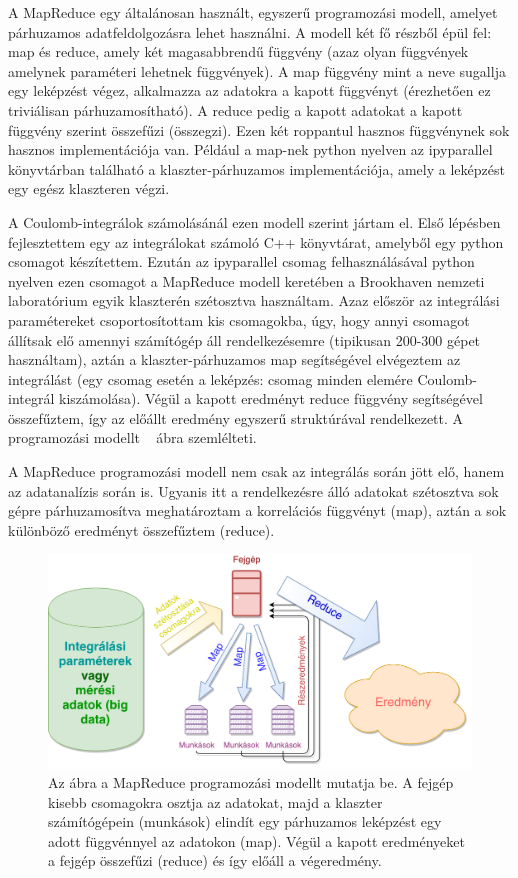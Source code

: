 \documentclass[11pt,a4paper]{article}
\numberwithin{equation}{subsection}
\numberwithin{figure}{section}
\begin{document}
A MapReduce egy általánosan használt, egyszerű programozási modell, amelyet párhuzamos adatfeldolgozásra lehet használni. A modell két fő részből épül fel: map és reduce, amely két magasabbrendű függvény (azaz olyan függvények amelynek paraméteri lehetnek függvények). A map függvény mint a neve sugallja egy leképzést végez, alkalmazza az adatokra a kapott függvényt (érezhetően ez triviálisan párhuzamosítható). A reduce pedig a kapott adatokat a kapott függvény szerint összefűzi (összegzi). Ezen két roppantul hasznos függvénynek sok hasznos implementációja van. Például a map-nek python nyelven az ipyparallel könyvtárban található a klaszter-párhuzamos implementációja, amely a leképzést egy egész klaszteren végzi. 

A Coulomb-integrálok számolásánál ezen modell szerint jártam el. Első lépésben fejlesztettem egy az integrálokat számoló C++ könyvtárat, amelyből egy python csomagot készítettem. Ezután az ipyparallel csomag felhasználásával python nyelven ezen csomagot a MapReduce modell keretében a Brookhaven nemzeti laboratórium egyik klaszterén szétosztva használtam. Azaz először az integrálási paramétereket csoportosítottam kis csomagokba, úgy, hogy annyi csomagot állítsak elő amennyi számítógép áll rendelkezésemre (tipikusan 200-300 gépet használtam), aztán a klaszter-párhuzamos map segítségével elvégeztem az integrálást (egy csomag esetén a leképzés: csomag minden elemére Coulomb-integrál kiszámolása). Végül a kapott eredményt reduce függvény segítségével összefűztem, így az előállt eredmény egyszerű struktúrával rendelkezett. A programozási modellt ~ ábra szemlélteti.

A MapReduce programozási modell nem csak az integrálás során jött elő, hanem az adatanalízis során is. Ugyanis itt a rendelkezésre álló adatokat szétosztva sok gépre párhuzamosítva meghatároztam a korrelációs függvényt (map), aztán a sok különböző eredményt összefűztem (reduce).

\begin{figure}[H]
\centering
\includegraphics[scale=0.4]{pic/prog/MapReduce}
\caption{Az ábra a MapReduce programozási modellt mutatja be. A fejgép kisebb csomagokra osztja az adatokat, majd a klaszter számítógépein (munkások) elindít egy párhuzamos leképzést egy adott függvénnyel az adatokon (map). Végül a kapott eredményeket a fejgép összefűzi (reduce) és így előáll a végeredmény. }
\label{fig:mapreduce}
\end{figure}
\end{document}
